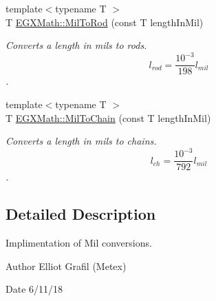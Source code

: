 \begin{DoxyCompactItemize}
{\footnotesize template$<$typename T $>$ }\\T \mbox{\hyperlink{group___e_g_x_math-_conversions-_length_conversions-_imperial-_mil-_surveyors_gae5721b0cf84304ecfade5a7808814329}{E\+G\+X\+Math\+::\+Mil\+To\+Rod}} (const T length\+In\+Mil)
\begin{DoxyCompactList}\small\item\em Converts a length in mils to rods. \[ l_{rod}= \frac{10^{-3}}{198} l_{mil} \]. \end{DoxyCompactList}\item 
{\footnotesize template$<$typename T $>$ }\\T \mbox{\hyperlink{group___e_g_x_math-_conversions-_length_conversions-_imperial-_mil-_surveyors_gac2207a6f05f3d2e7dfec2eade3fdf431}{E\+G\+X\+Math\+::\+Mil\+To\+Chain}} (const T length\+In\+Mil)
\begin{DoxyCompactList}\small\item\em Converts a length in mils to chains. \[ l_{ch}= \frac{10^{-3}}{792} l_{mil} \]. \end{DoxyCompactList}\end{DoxyCompactItemize}


\subsection{Detailed Description}
Implimentation of Mil conversions. 

\begin{DoxyAuthor}{Author}
Elliot Grafil (Metex) 
\end{DoxyAuthor}
\begin{DoxyDate}{Date}
6/11/18 
\end{DoxyDate}

